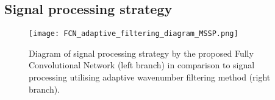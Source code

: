 	\subsection{Signal processing strategy}
	\begin{figure}
		\centering
		\texttt{[image: FCN\_adaptive\_filtering\_diagram\_MSSP.png]}
		\caption{Diagram of signal processing strategy by the proposed Fully Convolutional Network (left branch) in comparison to signal processing 	utilising adaptive wavenumber filtering method (right branch). }
		\label{fig:sig_proc_strategy}
	\end{figure}